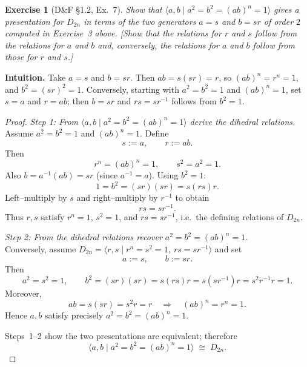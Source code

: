 \documentclass[12pt]{article}
\newtheorem{exercise}[theorem]{Exercise}
\theoremstyle{definition}
\begin{document}
\newpage

\begin{exercise}[D\&F §1.2, Ex.~7]
Show that $\langle a,b \mid a^{2}=b^{2}=(ab)^{n}=1\rangle$ gives a presentation for $D_{2n}$
in terms of the two generators $a=s$ and $b=sr$ of order $2$ computed in Exercise~3 above.
[Show that the relations for $r$ and $s$ follow from the relations for $a$ and $b$ and, conversely,
the relations for $a$ and $b$ follow from those for $r$ and $s$.]
\end{exercise}

\dotfill

\noindent
\textbf{Intuition.}
Take $a=s$ and $b=sr$. Then $ab=s(sr)=r$, so $(ab)^{n}=r^{n}=1$, and $b^{2}=(sr)^{2}=1$.
Conversely, starting with $a^{2}=b^{2}=1$ and $(ab)^{n}=1$, set $s=a$ and $r=ab$; then
$b= s r$ and $rs=sr^{-1}$ follows from $b^{2}=1$.

\dotfill

\begin{proof}
\noindent\emph{Step 1: From $\langle a,b\mid a^{2}=b^{2}=(ab)^{n}=1\rangle$ derive the dihedral relations.}\\

\noindent
Assume $a^{2}=b^{2}=1$ and $(ab)^{n}=1$. Define
\[
s:=a,\qquad r:=ab.
\]
Then
\[
r^{n}=(ab)^{n}=1,\qquad s^{2}=a^{2}=1.
\]
Also $b= a^{-1} (ab)= s r$ (since $a^{-1}=a$). Using $b^{2}=1$:
\[
1=b^{2}=(sr)(sr)=s(rs)r.
\]
Left–multiply by $s$ and right–multiply by $r^{-1}$ to obtain
\[
rs = s r^{-1}.
\]
Thus $r,s$ satisfy $r^{n}=1$, $s^{2}=1$, and $rs=sr^{-1}$, i.e.\ the defining relations of $D_{2n}$.

\dotfill

\noindent\emph{Step 2: From the dihedral relations recover $a^{2}=b^{2}=(ab)^{n}=1$.}\\

\noindent
Conversely, assume $D_{2n}=\langle r,s\mid r^{n}=s^{2}=1,\ rs=sr^{-1}\rangle$ and set
\[
a:=s,\qquad b:=sr.
\]
Then
\[
a^{2}=s^{2}=1,\qquad b^{2}=(sr)(sr)=s(rs)r=s(sr^{-1})r=s^{2}r^{-1}r=1.
\]
Moreover,
\[
ab=s(sr)=s^{2}r=r\quad\Longrightarrow\quad (ab)^{n}=r^{n}=1.
\]
Hence $a,b$ satisfy precisely $a^{2}=b^{2}=(ab)^{n}=1$.

\dotfill

Steps~1–2 show the two presentations are equivalent; therefore
\[
\langle a,b \mid a^{2}=b^{2}=(ab)^{n}=1\rangle \;\cong\; D_{2n}.
\]
\end{proof}
\end{document}
